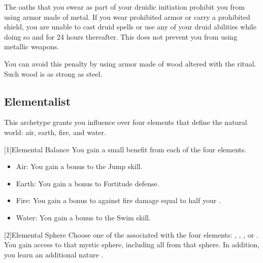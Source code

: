         The oaths that you swear as part of your druidic initiation prohibit you from using armor made of metal.
        If you wear prohibited armor or carry a prohibited shield, you are unable to cast druid spells or use any of your  druid abilities while doing so and for 24 hours thereafter.
        This does not prevent you from using metallic weapons.

        You can avoid this penalty by using armor made of wood altered with the  ritual.
        Such wood is as strong as steel.

    \subsection{Elementalist}\label{Elementalist}
        This archetype grants you influence over four elements that define the natural world: air, earth, fire, and water.

        [1]{Elemental Balance} You gain a small benefit from each of the four elements.
        \begin{itemize}
            \item Air: You gain a  bonus to the Jump skill.
            \item Earth: You gain a  bonus to Fortitude defense.
            \item Fire: You gain a bonus to  against fire damage equal to half your .
            \item Water: You gain a  bonus to the Swim skill.
        \end{itemize}

        [2]{Elemental Sphere} Choose one of the  associated with the four elements: , , , or .
        You gain access to that mystic sphere, including all  from that sphere.
        In addition, you learn an additional nature .

